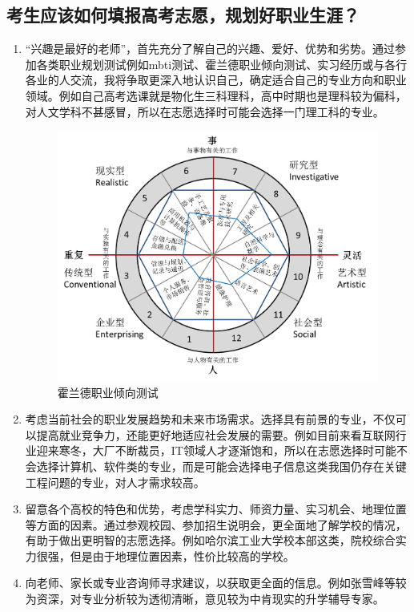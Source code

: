 \documentclass[square]{article}
\begin{document}
\subsection{考生应该如何填报高考志愿，规划好职业生涯？}

\begin{enumerate}
	\item “兴趣是最好的老师”，首先充分了解自己的兴趣、爱好、优势和劣势。通过参加各类职业规划测试例如mbti测试、霍兰德职业倾向测试、实习经历或与各行各业的人交流，我将争取更深入地认识自己，确定适合自己的专业方向和职业领域。例如自己高考选课就是物化生三科理科，高中时期也是理科较为偏科，对人文学科不甚感冒，所以在志愿选择时可能会选择一门理工科的专业。
	\begin{figure}[h!]
		\centering
		\includegraphics[width=12cm]{zhiye.png}
		\caption{霍兰德职业倾向测试}
		\label{fig:zhiye}
	\end{figure}
	\item 考虑当前社会的职业发展趋势和未来市场需求。选择具有前景的专业，不仅可以提高就业竞争力，还能更好地适应社会发展的需要。例如目前来看互联网行业迎来寒冬，大厂不断裁员，IT领域人才逐渐饱和，所以在志愿选择时可能不会选择计算机、软件类的专业，而是可能会选择电子信息这类我国仍存在关键工程问题的专业，对人才需求较高。
	\item 留意各个高校的特色和优势，考虑学科实力、师资力量、实习机会、地理位置等方面的因素。通过参观校园、参加招生说明会，更全面地了解学校的情况，有助于做出更明智的志愿选择。例如哈尔滨工业大学校本部这类，院校综合实力很强，但是由于地理位置因素，性价比较高的学校。
	\item 向老师、家长或专业咨询师寻求建议，以获取更全面的信息。例如张雪峰等较为资深，对专业分析较为透彻清晰，意见较为中肯现实的升学辅导专家。

\end{enumerate}
\end{document}
